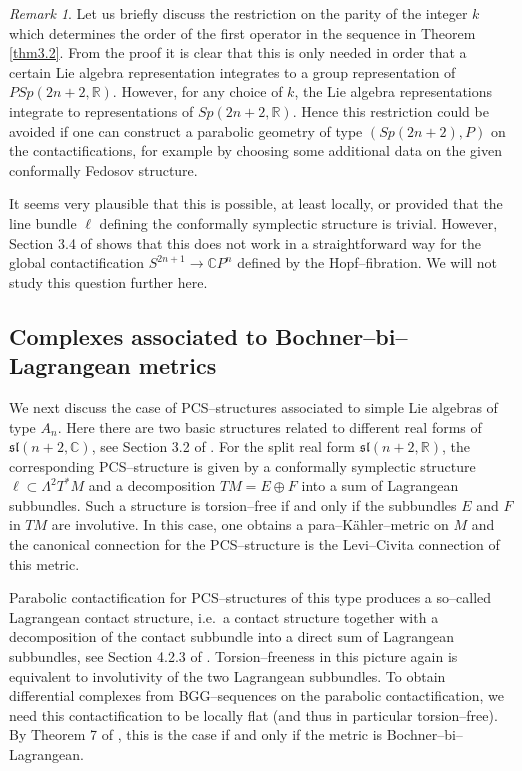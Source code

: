 \documentclass[12pt,a4paper]{amsart}
\def\frak{\mathfrak}
\def\Bbb{\mathbb}
\newcommand{\La}{\Lambda}
\newcounter{theorem}
\numberwithin{theorem}{section}
\theoremstyle{definition}
\theoremstyle{remark}
\newtheorem{remark}[theorem]{Remark}
\begin{document}
\begin{remark}\label{rem3.2}
Let us briefly discuss the restriction on the parity of the integer
$k$ which determines the order of the first operator in the sequence
in Theorem \ref{thm3.2}. From the proof it is clear that this is only
needed in order that a certain Lie algebra representation integrates
to a group representation of $PSp(2n+2,\Bbb R)$. However, for any
choice of $k$, the Lie algebra representations integrate to
representations of $Sp(2n+2,\Bbb R)$. Hence this restriction could be
avoided if one can construct a parabolic geometry of type
$(Sp(2n+2),P)$ on the contactifications, for example by choosing some
additional data on the given conformally Fedosov structure. 

It seems very plausible that this is possible, at least locally, or
provided that the line bundle $\ell$ defining the conformally
symplectic structure is trivial. However, Section 3.4 of \cite{PCS2}
shows that this does not work in a straightforward way for the global
contactification $S^{2n+1}\to\Bbb CP^n$ defined by the
Hopf--fibration. We will not study this question further here.  
\end{remark}

\subsection{Complexes associated to Bochner--bi--La\-gran\-gean
  metrics}\label{3.3} 

We next discuss the case of PCS--structures associated to simple Lie
algebras of type $A_n$. Here there are two basic structures related to
different real forms of $\frak{sl}(n+2,\Bbb C)$, see Section 3.2 of
\cite{PCS1}. For the split real form $\frak{sl}(n+2,\Bbb R)$, the
corresponding PCS--structure is given by a conformally symplectic
structure $\ell\subset \La^2T^*M$ and a decomposition $TM=E\oplus F$
into a sum of Lagrangean subbundles. Such a structure is torsion--free
if and only if the subbundles $E$ and $F$ in $TM$ are involutive. In
this case, one obtains a para--K\"ahler--metric on $M$ and the
canonical connection for the PCS--structure is the Levi--Civita
connection of this metric.

Parabolic contactification for PCS--structures of this type produces
a so--called Lagrangean contact structure, i.e.~a contact structure
together with a decomposition of the contact subbundle into a direct
sum of Lagrangean subbundles, see Section 4.2.3 of
\cite{book}. Torsion--freeness in this picture again is equivalent to
involutivity of the two Lagrangean subbundles. To obtain differential
complexes from BGG--sequences on the parabolic contactification, we
need this contactification to be locally flat (and thus in particular
torsion--free). By Theorem 7 of \cite{PCS2}, this is the case if
and only if the metric is Bochner--bi--Lagrangean.
\end{document}
